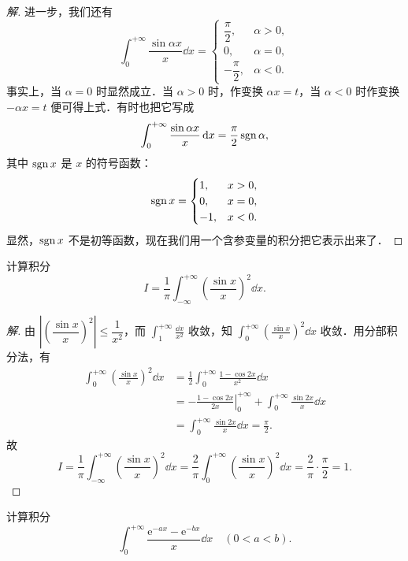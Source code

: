 \begin{proof}[解]
进一步，我们还有
\[
\int_{0}^{+\infty}\frac{\sin\alpha x}{x}\dd x=\begin{cases}
\dfrac{\pi}{2},&\alpha>0,\\
0,&\alpha=0,\\
-\dfrac{\pi}{2},&\alpha<0.
\end{cases}
\]
事实上，当 $\alpha=0$ 时显然成立．当 $\alpha>0$ 时，作变换 $\alpha x=t$，当 $\alpha<0$ 时作变换 $-\alpha x=t$ 便可得上式．有时也把它写成
\[
\int_{0}^{+\infty}\frac{\sin\alpha x}{x}\,\mathrm{d} x=\frac{\pi}{2}\operatorname{sgn}\alpha,
\]
其中 $\operatorname{sgn} x$ 是 $x$ 的符号函数：
\[
\operatorname{sgn} x=\begin{cases}
1,&x>0,\\
0,&x=0,\\
-1,&x<0.
\end{cases}
\]
显然，$\operatorname{sgn} x$ 不是初等函数，现在我们用一个含参变量的积分把它表示出来了．
\end{proof}

\begin{example}\label{ex:19-2-5}
计算积分
\[
I=\frac{1}{\pi}\int_{-\infty}^{+\infty}\left(\frac{\sin x}{x}\right)^{2}\dd x.
\]
\end{example}

\begin{proof}[解]
由 $\left|\left(\dfrac{\sin x}{x}\right)^{2}\right|\leqslant\dfrac{1}{x^{2}}$，而 $\displaystyle\int_{1}^{+\infty}\frac{\dd x}{x^{2}}$ 收敛，知 $\displaystyle\int_{0}^{+\infty}\left(\frac{\sin x}{x}\right)^{2}\dd x$ 收敛．用分部积分法，有
\[
\begin{aligned}
\int_{0}^{+\infty}\left(\frac{\sin x}{x}\right)^{2}\dd x&=\frac{1}{2}\int_{0}^{+\infty}\frac{1-\cos 2x}{x^{2}}\dd x\\
&=-\left.\frac{1-\cos 2x}{2x}\right|_{0}^{+\infty}+\int_{0}^{+\infty}\frac{\sin 2x}{x}\dd x\\
&=\int_{0}^{+\infty}\frac{\sin 2x}{x}\dd x=\frac{\pi}{2}.
\end{aligned}
\]
故
\[
I=\frac{1}{\pi}\int_{-\infty}^{+\infty}\left(\frac{\sin x}{x}\right)^{2}\dd x=\frac{2}{\pi}\int_{0}^{+\infty}\left(\frac{\sin x}{x}\right)^{2}\dd x=\frac{2}{\pi}\cdot\frac{\pi}{2}=1.
\]
\end{proof}

\begin{example}\label{ex:19-2-6}
计算积分
\[
\int_{0}^{+\infty}\frac{\mathrm{e}^{-ax}-\mathrm{e}^{-bx}}{x}\dd x\quad(0<a<b).
\]
\end{example}

